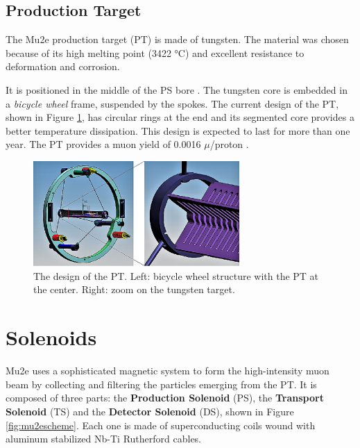 \subsection{Production Target}
The Mu2e production target (PT) is made of tungsten. 
The material was chosen because of its high 
melting point (3422 °C) and excellent resistance to deformation and corrosion.

It is positioned in the middle of the PS bore \cite{bartoszek2015mu2e}.
The tungsten core is embedded in a \textit{bicycle wheel} frame, 
suspended by the spokes.
The current design of the PT, shown in Figure \ref{fig:PT}, 
has circular rings at the end and its segmented core provides a better temperature 
dissipation. This design is expected to last for more than one year. The PT provides a muon yield of 0.0016 $\mu$/proton \cite{PT}.
\begin{figure}[!h]
    \centering
    \includegraphics[width =0.7\textwidth]{figures/png/Screenshot_20240706_114229.png}
    \caption[The Production Target design.]{The design of the PT. Left: bicycle wheel 
      structure with the PT at the
    center. Right: zoom on the tungsten target.}
    \label{fig:PT}
\end{figure}

\section{Solenoids}
Mu2e uses a sophisticated magnetic system
to form the high-intensity muon beam by collecting and filtering the particles emerging from the PT. 
It is composed of three parts: the \textbf{Production Solenoid} (PS), 
the \textbf{Transport Solenoid} (TS) 
and the \textbf{Detector Solenoid} (DS), shown in Figure \ref{fig:mu2escheme}. 
Each one is made of superconducting 
coils wound with aluminum stabilized Nb-Ti Rutherford cables.

